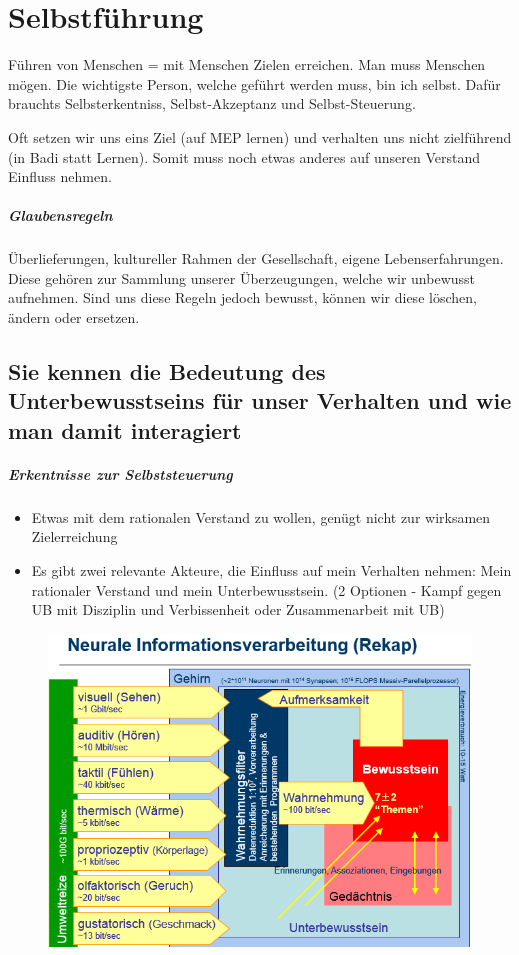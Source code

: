 \chapter{Selbstführung}
Führen von Menschen = mit Menschen Zielen erreichen. Man muss Menschen mögen. Die wichtigste Person, welche geführt werden muss, bin ich selbst. Dafür brauchts Selbsterkentniss, Selbst-Akzeptanz und Selbst-Steuerung.

Oft setzen wir uns eins Ziel (auf MEP lernen) und verhalten uns nicht zielführend (in Badi statt Lernen). Somit muss noch etwas anderes auf unseren Verstand Einfluss nehmen.

\paragraph{Glaubensregeln}
Überlieferungen, kultureller Rahmen der Gesellschaft, eigene Lebenserfahrungen. Diese gehören zur Sammlung unserer Überzeugungen, welche wir unbewusst aufnehmen. Sind uns diese Regeln jedoch bewusst, können wir diese löschen, ändern oder ersetzen.

\section{Sie kennen die Bedeutung des Unterbewusstseins für unser Verhalten und wie man damit interagiert}

\paragraph{Erkentnisse zur Selbststeuerung}
\begin{itemize}
	\item Etwas mit dem rationalen Verstand zu wollen, genügt nicht zur wirksamen Zielerreichung
	\item Es gibt zwei relevante Akteure, die Einfluss auf mein Verhalten nehmen: Mein rationaler Verstand und mein Unterbewusstsein. (2 Optionen - Kampf gegen UB mit Disziplin und Verbissenheit oder Zusammenarbeit mit UB)
\end{itemize}

\begin{figure}[h!]
	\centering
	\includegraphics[width=0.7\linewidth]{fig/neurale-informationverarbeitung}
	\caption{}
	\label{fig:neurale-informationverarbeitung}
\end{figure}

